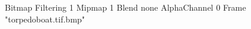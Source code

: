 {Bitmap
	{Filtering 1}
	{Mipmap 1}
	{Blend none}
	{AlphaChannel 0}
	{Frame "torpedoboat.tif.bmp"}
}
